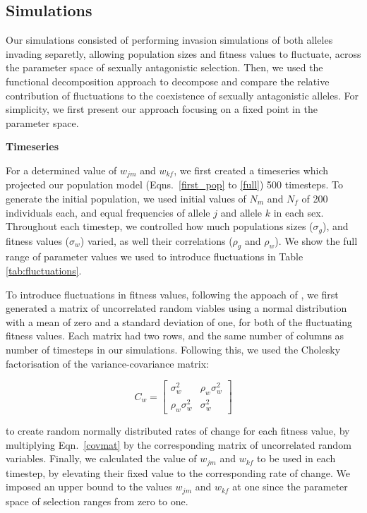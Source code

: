 \documentclass[]{article}
\begin{document}
\subsection*{Simulations}

Our simulations consisted of performing  invasion simulations of both alleles invading separetly, allowing population sizes and fitness values to fluctuate, across the parameter space of sexually antagonistic selection. Then, we used the functional decomposition approach to decompose and compare the relative contribution of fluctuations to the coexistence of sexually antagonistic alleles. For simplicity, we first present our approach focusing on a fixed point in the parameter space.

\vspace{5mm}
\noindent\textbf{Timeseries}

For a determined value of $w_{jm}$ and $w_{kf}$, we first created a timeseries which projected our population model (Eqns.~\ref{first_pop} to \ref{full}) 500 timesteps. To generate the initial population, we used initial values of $N_{m}$ and $N_{f}$  of 200 individuals each, and equal frequencies of allele $j$ and allele $k$ in each sex. Throughout each timestep, we controlled how much populations sizes ($\sigma_{g}$), and fitness values ($\sigma_{w}$) varied, as well their correlations ($\rho_{g}$ and $\rho_{w}$). We show the full range of parameter values we used to introduce fluctuations in Table \ref{tab:fluctuations}.

To introduce fluctuations in fitness values, following the appoach of  \citet{shoemaker2020}, we first generated a matrix of uncorrelated random viables using a normal distribution with a mean of zero and a standard deviation of one, for both of the fluctuating fitness values. Each matrix had two rows, and the same number of columns as number of timesteps in our simulations. Following this, we used the Cholesky factorisation of the variance-covariance matrix:


\begin{equation}
C_{w} = \begin{bmatrix}
\sigma_{w}^{2} & \rho_{w} \sigma_{w}^{2} \\
\rho_{w} \sigma_{w}^{2} & \sigma_{w}^{2}
\end{bmatrix}
\label{covmat}
\end{equation}

to create random normally distributed  rates of change for each fitness value, by multiplying Eqn.~\ref{covmat} by the corresponding matrix of uncorrelated random variables. Finally, we calculated the value of $w_{jm}$ and $w_{kf}$ to be used in each timestep, by elevating their fixed value to the corresponding rate of change. We imposed an upper bound to the values $w_{jm}$ and $w_{kf}$ at one since the parameter space of selection ranges from zero to one.
\end{document}
